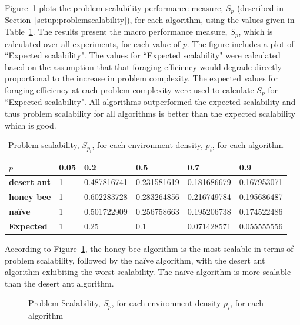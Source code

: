 Figure~\ref{fig:problemscalability} plots the problem scalability performance measure, $S_p$ (described in Section~\ref{setup:problemscalability}), for each algorithm, using the values given in Table~\ref{table:problemscalability}. The results present the macro performance measure, $S_p$, which is calculated over all experiments, for each value of $p$. The figure includes a plot of ``Expected scalability". The values for ``Expected scalability" were calculated based on the assumption that  that foraging efficiency would degrade directly proportional to the increase in problem complexity. The expected values for foraging efficiency at each problem complexity were used to calculate $S_p$ for ``Expected scalability". All algorithms outperformed the expected scalability and thus problem scalability for all algorithms is better than the expected scalability which is good. 


\begin{table}[!htbp]
    \centering
    \caption{Problem scalability, $S_{p_i}$, for each environment density, $p_i$, for each algorithm}
    \label{table:problemscalability}
    \begin{tabular}{@{}llllll@{}}
    \toprule
    \textbf{$p$}                  & \textbf{0.05} & \textbf{0.2        } & \textbf{0.5}         & \textbf{0.7}         & \textbf{0.9}         \\ \midrule
    \textbf{desert ant}           & 1    & 0.487816741 & 0.231581619 & 0.181686679 & 0.167953071 \\
    \textbf{honey bee}            & 1    & 0.602283728 & 0.283264856 & 0.216749784 & 0.195686487 \\
    \textbf{na\"ive}              & 1    & 0.501722909 & 0.256758663 & 0.195206738 & 0.174522486 \\
    \textbf{Expected} & 1    & 0.25        & 0.1         & 0.071428571 & 0.055555556 \\ \bottomrule
    \end{tabular}
\end{table}

According to Figure~\ref{fig:problemscalability}, the honey bee algorithm is the most scalable in terms of problem scalability, followed by the na\"ive algorithm, with the desert ant algorithm exhibiting the worst scalability. The na\"ive algorithm is more scalable than the desert ant algorithm. 


\begin{figure}[!htbp]
    \centering
    \resizebox{\textwidth}{!}{}
    \caption{Problem Scalability, $S_p$, for each environment density $p_i$, for each algorithm}
    \label{fig:problemscalability}
\end{figure}
    


